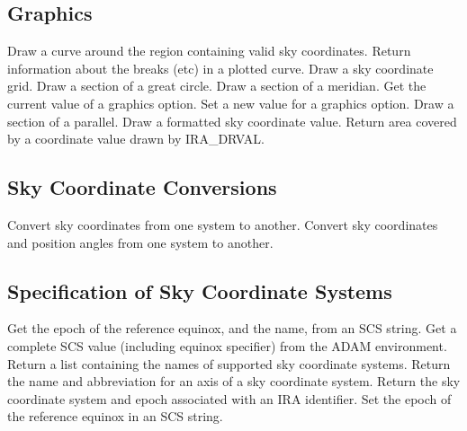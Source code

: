 \subsection {Graphics}
   {Draw a curve around the region containing valid sky coordinates.}
   {Return information about the breaks (etc) in a plotted curve.}
   {Draw a sky coordinate grid.}
   {Draw a section of a great circle.}
   {Draw a section of a meridian.}
   {Get the current value of a graphics option.}
   {Set a new value for a graphics option.}
   {Draw a section of a parallel.}
   {Draw a formatted sky coordinate value.}
   {Return area covered by a coordinate value drawn by IRA\_DRVAL.}

\subsection {Sky Coordinate Conversions}
   {Convert sky coordinates from one system to another.}
   {Convert sky coordinates and position angles from one system to another.}

\subsection {Specification of Sky Coordinate Systems}
   {Get the epoch of the reference equinox, and the name, from an SCS string.}
   {Get a complete SCS value (including equinox specifier) from the ADAM
    environment.}
   {Return a list containing the names of supported sky coordinate systems.}
   {Return the name and abbreviation for an axis of a sky coordinate system.}
   {Return the sky coordinate system and epoch associated with an IRA
    identifier.}
   {Set the epoch of the reference equinox in an SCS string.}

